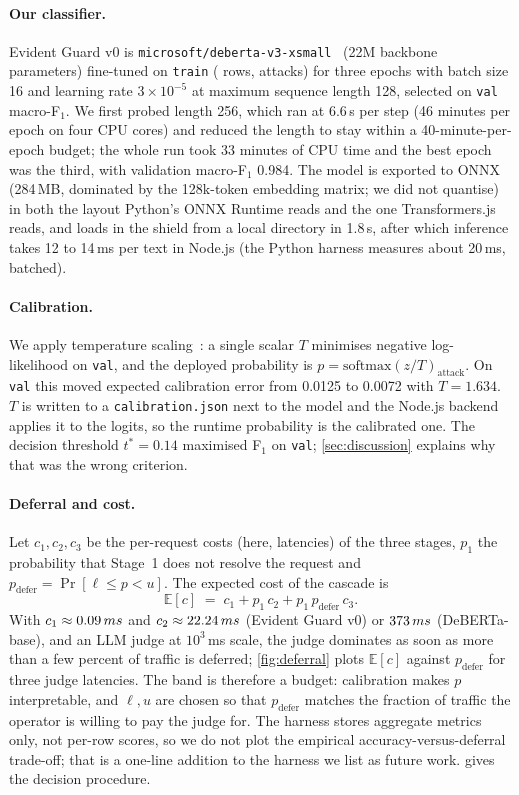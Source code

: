 \documentclass[10pt,a4paper]{article}
\newcommand{\eg}{Evident Guard v0}
\newcommand{\ms}{\,ms}
\begin{document}
\paragraph{Our classifier.} \eg{} is \texttt{microsoft/deberta-v3-xsmall}~\cite{he2023debertav3} (22M backbone parameters) fine-tuned on \texttt{train} (\ntrain{} rows, \ntrainattack{} attacks) for three epochs with batch size 16 and learning rate $3\times10^{-5}$ at maximum sequence length 128, selected on \texttt{val} macro-F$_1$. We first probed length 256, which ran at 6.6\,s per step (46 minutes per epoch on four CPU cores) and reduced the length to stay within a 40-minute-per-epoch budget; the whole run took 33 minutes of CPU time and the best epoch was the third, with validation macro-F$_1$ 0.984. The model is exported to ONNX (284\,MB, dominated by the 128k-token embedding matrix; we did not quantise) in both the layout Python's ONNX Runtime reads and the one Transformers.js reads, and loads in the shield from a local directory in 1.8\,s, after which inference takes 12 to 14\ms{} per text in Node.js (the Python harness measures about 20\ms, batched).

\paragraph{Calibration.} We apply temperature scaling~\cite{guo2017calibration}: a single scalar $T$ minimises negative log-likelihood on \texttt{val}, and the deployed probability is $p = \mathrm{softmax}(z/T)_{\text{attack}}$. On \texttt{val} this moved expected calibration error from 0.0125 to 0.0072 with $T = 1.634$. $T$ is written to a \texttt{calibration.json} next to the model and the Node.js backend applies it to the logits, so the runtime probability is the calibrated one. The decision threshold $t^\ast = 0.14$ maximised F$_1$ on \texttt{val}; \cref{sec:discussion} explains why that was the wrong criterion.

\paragraph{Deferral and cost.} Let $c_1, c_2, c_3$ be the per-request costs (here, latencies) of the three stages, $p_1$ the probability that Stage~1 does not resolve the request and $p_{\text{defer}} = \Pr[\ell \le p < u]$. The expected cost of the cascade is
\[
\mathbb{E}[c] \;=\; c_1 + p_1\, c_2 + p_1\, p_{\text{defer}}\, c_3 .
\]
With $c_1 \approx \mregexmediumtestoodlatency\ms$ and $c_2 \approx \mevidentguardvzerotestoodlatency\ms$ (\eg) or $\mprotectaidebertavtwotestoodlatency\ms$ (DeBERTa-base), and an LLM judge at $10^3$\ms{} scale, the judge dominates as soon as more than a few percent of traffic is deferred; \cref{fig:deferral} plots $\mathbb{E}[c]$ against $p_{\text{defer}}$ for three judge latencies. The band is therefore a budget: calibration makes $p$ interpretable, and $\ell, u$ are chosen so that $p_{\text{defer}}$ matches the fraction of traffic the operator is willing to pay the judge for. The harness stores aggregate metrics only, not per-row scores, so we do not plot the empirical accuracy-versus-deferral trade-off; that is a one-line addition to the harness we list as future work.  gives the decision procedure.
\end{document}
